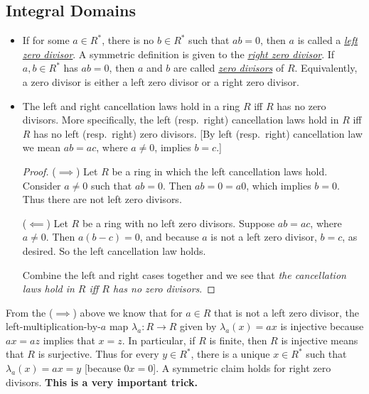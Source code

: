 \documentclass[11pt]{article}
\newcommand{\df}[1]{\ul{\textit{\textsf{#1}}}}
\begin{document}
\subsection{Integral Domains}
\begin{itemize}
    \item If for some $a \in R^*$, there is no $b \in R^*$ such that $ab = 0$, then $a$ is called a \df{left zero divisor}. A symmetric definition is given to the \df{right zero divisor}. If $a,b \in R^*$ has $ab=0$, then $a$ and $b$ are called \df{zero divisors} of $R$. Equivalently, a zero divisor is either a left zero divisor or a right zero divisor.
    \item The left and right cancellation laws hold in a ring $R$ iff $R$ has no zero divisors. More specifically, the left (resp.\ right) cancellation laws hold in $R$ iff $R$ has no left (resp.\ right) zero divisors. [By left (resp.\ right) cancellation law we mean $ab = ac$, where $a \neq 0$, implies $b=c$.]
    \begin{proof}
        ($\implies$) Let $R$ be a ring in which the left cancellation laws hold. Consider $a \neq 0$ such that $ab=0$. Then $ab = 0 = a0$, which implies $b=0$. Thus there are not left zero divisors.

        ($\impliedby$) Let $R$ be a ring with no left zero divisors. Suppose $ab=ac$, where $a \neq 0$. Then $a(b-c)=0$, and because $a$ is not a left zero divisor, $b=c$, as desired. So the left cancellation law holds.

        Combine the left and right cases together and we see that \emph{the cancellation laws hold in $R$ iff $R$ has no zero divisors}.
    \end{proof}
\end{itemize}
\begin{framed}
From the ($\implies$) above we know that for $a \in R$ that is not a left zero divisor, the left-multiplication-by-$a$ map $\lambda_a: R \to R$ given by $\lambda_a(x) = ax$ is injective because $ax = az$ implies that $x = z$. In particular, if $R$ is finite, then $R$ is injective means that $R$ is surjective. Thus for every $y \in R^*$, there is a unique $x \in R^*$ such that $\lambda_a(x)=ax=y$ [because $0x=0$]. A symmetric claim holds for right zero divisors. \textbf{This is a very important trick.}
\end{framed}
\end{document}
